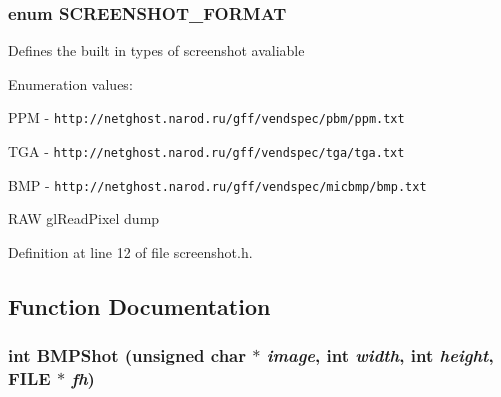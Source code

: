 \subsubsection{\setlength{\rightskip}{0pt plus 5cm}enum {\bf SCREENSHOT\_\-FORMAT}}\label{screenshot_8h_a9}


Defines the built in types of screenshot avaliable \begin{Desc}
\item[Enumeration values: ]\par
\begin{description}
\item[{\em 
SCREENSHOT\_\-PPM\label{screenshot_8h_a9a0}
}]PPM - {\tt http://netghost.narod.ru/gff/vendspec/pbm/ppm.txt} \item[{\em 
SCREENSHOT\_\-TGA\label{screenshot_8h_a9a1}
}]TGA - {\tt http://netghost.narod.ru/gff/vendspec/tga/tga.txt} \item[{\em 
SCREENSHOT\_\-BMP\label{screenshot_8h_a9a2}
}]BMP - {\tt http://netghost.narod.ru/gff/vendspec/micbmp/bmp.txt} \item[{\em 
SCREENSHOT\_\-RAW\label{screenshot_8h_a9a3}
}]RAW gl\-Read\-Pixel dump \end{description}
\end{Desc}



Definition at line 12 of file screenshot.h.

\subsection{Function Documentation}
\subsubsection{\setlength{\rightskip}{0pt plus 5cm}int BMPShot (unsigned char $\ast$ {\em image}, int {\em width}, int {\em height}, FILE $\ast$ {\em fh})}\label{screenshot_8h_a5}


